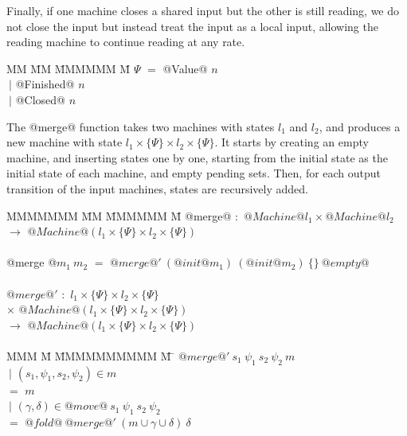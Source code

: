 Finally, if one machine closes a shared input but the other is still reading, we do not close the input but instead treat the input as a local input, allowing the reading machine to continue reading at any rate. 

\begin{tabbing}
MM \= MM \= MMMMMM \= M\kill
$\Psi$ \> $=$  \> @Value@     \> $n$         \\
       \> $~|$ \> @Finished@  \> $n$         \\
       \> $~|$ \> @Closed@    \> $n$         \\
\end{tabbing}

The @merge@ function takes two machines with states $l_1$ and $l_2$, and produces a new machine with state $l_1 \times \{\Psi\} \times l_2 \times \{\Psi\}$.
It starts by creating an empty machine, and inserting states one by one, starting from the initial state as the initial state of each machine, and empty pending sets.
Then, for each output transition of the input machines, states are recursively added.

\begin{tabbing}
MMMMMMM \= MM \= MMMMMM \= M\kill
@merge@ \> $:$ \> $@Machine @l_1 \times @Machine @l_2$ \\
        \> $\to$ \> $@Machine @(l_1 \times \{\Psi\} \times l_2 \times \{\Psi\})$ \\
\\
@merge @$m_1~m_2$ \> $=$ \> $@merge@'~(@init @m_1)~(@init @m_2)~\{\}~@empty@$ \\
\\
$@merge@'$ \> $:$ \> $l_1 \times \{\Psi\} \times l_2 \times \{\Psi\}$               \\
           \> $\times$ \> $@Machine @(l_1 \times \{\Psi\} \times l_2 \times \{\Psi\})$ \\
           \> $\to$ \> $@Machine @(l_1 \times \{\Psi\} \times l_2 \times \{\Psi\})$ \\
\\
MMM \= M \= MMMMMMMMMM \= M \=\kill
$@merge@'~s_1~\psi_1~s_2~\psi_2~m$ \\
 \> $~|$ \> $(s_1, \psi_1, s_2, \psi_2) \in m$  \\
 \> $=$  \> $m$ \\
 \> $~|$ \> $(\gamma,\delta) \in @move@~s_1~\psi_1~s_2~\psi_2$ \\
 \> $=$  \> $@fold@~@merge@'~(m \cup \gamma \cup \delta)~\delta$ \\
\end{tabbing}

